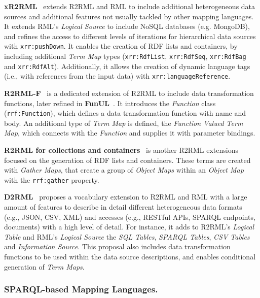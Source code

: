 \noindent\textbf{xR2RML}~\parencite{michel2015xr2rml} extends R2RML and RML to include additional heterogeneous data sources and additional features not usually tackled by other mapping languages. It extends RML's \textit{Logical Source} to include NoSQL databases (e.g. MongoDB), and refines the access to different levels of iterations for hierarchical data sources with \texttt{xrr:pushDown}. It enables the creation of RDF lists and containers, by including additional \textit{Term Map} types (\texttt{xrr:RdfList}, \texttt{xrr:RdfSeq}, \texttt{xrr:RdfBag} and \texttt{xrr:RdfAlt}). Additionally, it allows the creation of dynamic language tags (i.e., with references from the input data) with \texttt{xrr:languageReference}.

\noindent\textbf{R2RML-F}~\parencite{debruyne2016r2rmlf} is a dedicated extension of R2RML to include data transformation functions, later refined in \textbf{FunUL}~\parencite{junior2016funul}. It introduces the \textit{Function} class (\texttt{rrf:Function}), which defines a data transformation function with name and body. An additional type of \textit{Term Map} is defined, the \textit{Function Valued Term Map}, which connects with the \textit{Function} and supplies it with parameter bindings. 

\noindent\textbf{R2RML for collections and containers}~\parencite{debruyne2017R2RML-collections} is another R2RML extensions focused on the generation of RDF lists and containers. These terms are created with \textit{Gather Maps}, that create a group of \textit{Object Maps} within an \textit{Object Map} with the \texttt{rrf:gather} property. 

\noindent\textbf{D2RML}~\parencite{chortaras2018d2rml} proposes a vocabulary extension to R2RML and RML with a large amount of features to describe in detail different heterogeneous data formats (e.g., JSON, CSV, XML) and accesses (e.g., RESTful APIs, SPARQL endpoints, documents) with a high level of detail. For instance, it adds to R2RML's \textit{Logical Table} and RML's \textit{Logical Source} the \textit{SQL Tables}, \textit{SPARQL Tables}, \textit{CSV Tables} and \textit{Information Source}. This proposal also includes data transformation functions to be used within the data source descriptions, and enables conditional generation of \textit{Term Maps}. 




\subsubsection{SPARQL-based Mapping Languages.}
\label{sec:chp2_SPARQL-languages} 

